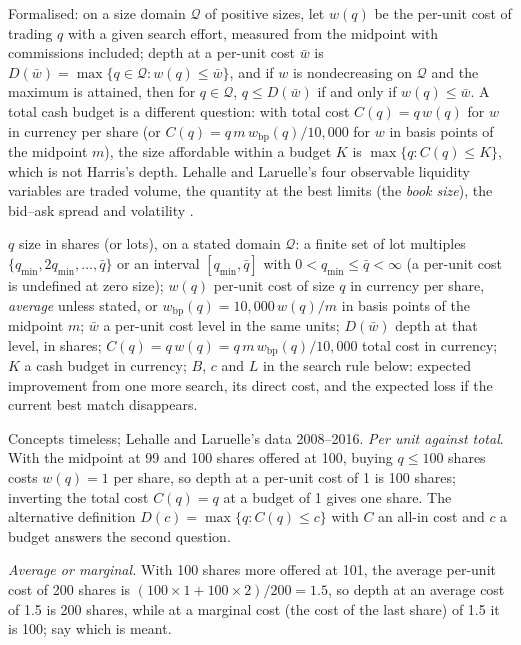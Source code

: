 \begin{qfdefinition}
Formalised: on a size domain $\mathcal Q$ of positive sizes, let $w(q)$ be the per-unit cost of trading $q$ with a given search effort, measured from the midpoint with commissions included; depth at a per-unit cost $\bar w$ is $D(\bar w)=\max\{q\in\mathcal Q:w(q)\le\bar w\}$, and if $w$ is nondecreasing on $\mathcal Q$ and the maximum is attained, then for $q\in\mathcal Q$, $q\le D(\bar w)$ if and only if $w(q)\le\bar w$. A total cash budget is a different question: with total cost $C(q)=q\,w(q)$ for $w$ in currency per share (or $C(q)=q\,m\,w_{\mathrm{bp}}(q)/10{,}000$ for $w$ in basis points of the midpoint $m$), the size affordable within a budget $K$ is $\max\{q:C(q)\le K\}$, which is not Harris's depth. Lehalle and Laruelle's four observable liquidity variables are traded volume, the quantity at the best limits (the \emph{book size}), the bid--ask spread and volatility \citep[chap.~2, sec.~2.2, pp.~143--148]{alpha-laruelle}.

 $q$ size in shares (or lots), on a stated domain $\mathcal Q$: a finite set of lot multiples $\{q_{\min},2q_{\min},\dots,\bar q\}$ or an interval $[q_{\min},\bar q]$ with $0<q_{\min}\le\bar q<\infty$ (a per-unit cost is undefined at zero size); $w(q)$ per-unit cost of size $q$ in currency per share, \emph{average} unless stated, or $w_{\mathrm{bp}}(q)=10{,}000\,w(q)/m$ in basis points of the midpoint $m$; $\bar w$ a per-unit cost level in the same units; $D(\bar w)$ depth at that level, in shares; $C(q)=q\,w(q)=q\,m\,w_{\mathrm{bp}}(q)/10{,}000$ total cost in currency; $K$ a cash budget in currency; $B$, $c$ and $L$ in the search rule below: expected improvement from one more search, its direct cost, and the expected loss if the current best match disappears.

 Concepts timeless; Lehalle and Laruelle's data 2008--2016. \emph{Per unit against total}. With the midpoint at 99 and 100 shares offered at 100, buying $q\le100$ shares costs $w(q)=1$ per share, so depth at a per-unit cost of 1 is 100 shares; inverting the total cost $C(q)=q$ at a budget of 1 gives one share. The alternative definition $D(c)=\max\{q:C(q)\le c\}$ with $C$ an all-in cost and $c$ a budget answers the second question.

\emph{Average or marginal.} With 100 shares more offered at 101, the average per-unit cost of 200 shares is $(100\times1+100\times2)/200=1.5$, so depth at an average cost of 1.5 is 200 shares, while at a marginal cost (the cost of the last share) of 1.5 it is 100; say which is meant.


\end{qfdefinition}
